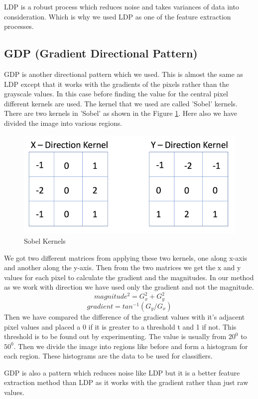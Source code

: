 \documentclass[conference]{IEEEtran}
\begin{document}
LDP is a robust process which reduces noise and takes variances of data into consideration. Which is why we used LDP as one of the feature extraction processes.

\subsection{GDP (Gradient Directional Pattern)}
GDP is another directional pattern which we used. This is almost the same as LDP except that it works with the gradients of the pixels rather than the grayscale values. In this case before finding the value for the central pixel different kernels are used. The kernel that we used are called 'Sobel' kernels. There are two kernels in 'Sobel' as shown in the Figure \ref{fig:sobelkernel}. Here also we have divided the image into various regions.
\begin{figure}
	\includegraphics[width=\linewidth]{sobelkernel.png}
	\caption{Sobel Kernels}
	\label{fig:sobelkernel}
\end{figure}
We got two different matrices from applying these two kernels, one along x-axis and another along the y-axis. Then from the two matrices we get the x and y values for each pixel to calculate the gradient and the magnitudes. In our method as we work with direction we have used only the gradient and not the magnitude.
\[magnitude^2 = G_x^2 + G_y^2\]
\[gradient = tan^{-1}(G_y/G_x)\]
Then we have compared the difference of the gradient values with it's adjacent pixel values and placed a 0 if it is greater to a threshold t and 1 if not. This threshold is to be found out by experimenting. The value is usually from $20^0$ to $50^0$. Then we divide the image into regions like before and form a histogram for each region. These histograms are the data to be used for classifiers.
	
GDP is also a pattern which reduces noise like LDP but it is a better feature extraction method than LDP as it works with the  gradient rather than just raw values.
\end{document}
